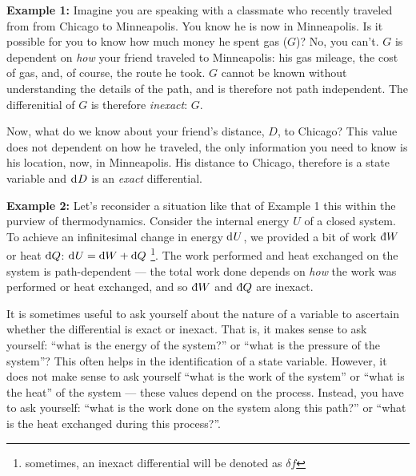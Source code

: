 \begin{displayquote}
	\textbf{Example 1:} Imagine you are speaking with a classmate who recently traveled from from Chicago to Minneapolis. You know he is now in Minneapolis. Is it possible for you to know how much money he spent gas ($G$)? No, you can't. $G$ is dependent on \emph{how} your friend traveled to Minneapolis: his gas mileage, the cost of gas, and, of course, the route he took. $G$ cannot be known without understanding the details of the path, and is therefore not path independent. The differenitial of $G$ is therefore \emph{inexact}: \text{\dj}$G$.
	
	Now, what do we know about your friend's distance, $D$, to Chicago? This value does not dependent on how he traveled, the only information you need to know is his location, now, in Minneapolis. His distance to Chicago, therefore is a state variable and $\mathop{}\!\mathrm{d^{}}{D}$ is an \emph{exact} differential. %
\end{displayquote}

\begin{displayquote}%
	\textbf{Example 2:} Let's reconsider a situation like that of Example 1 this within the purview of thermodynamics. Consider the internal energy  $U$ of a closed system. To achieve an infinitesimal change in energy $\mathop{}\!\mathrm{d^{}}{U}$, we provided a bit of work $\text{\dj}W$ or heat $\text{\dj}Q$:  $\Diff{}{U} = \text{\dj}W + \text{\dj}Q$ \footnote{sometimes, an inexact differential will be denoted as $\delta f$}. The work performed and heat exchanged on the system is path-dependent --- the total work done depends on \emph{how} the work was performed or heat exchanged, and so $\text{\dj}W$ and $\text{\dj}Q$ are inexact.
\end{displayquote}
	
It is sometimes useful to ask yourself about the nature of a variable to ascertain whether the differential is exact or inexact. That is, it makes sense to ask yourself: ``what is the energy of the system?'' or ``what is the pressure of the system''? This often helps in the identification of a state variable. However, it does not make sense to ask yourself ``what is the work of the system'' or ``what is the heat'' of the system --- these values depend on the process. Instead, you have to ask yourself: ``what is the work done on the system along this path?'' or ``what is the heat exchanged during this process?''.


